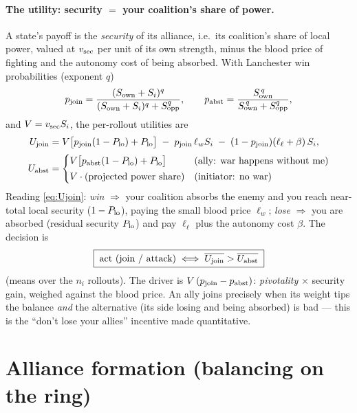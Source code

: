 \documentclass[11pt]{article}
\newcommand{\Sown}{S_{\mathrm{own}}}
\newcommand{\Sopp}{S_{\mathrm{opp}}}
\begin{document}
\paragraph{The utility: security $=$ your coalition's share of power.} A state's
payoff is the \emph{security} of its alliance, i.e.\ its coalition's share of
local power, valued at $v_{\rm sec}$ per unit of its own strength, minus the
blood price of fighting and the autonomy cost of being absorbed. With Lanchester
win probabilities (exponent $q$)
\begin{equation}
p_{\rm join}=\frac{(\Sown+S_i)^q}{(\Sown+S_i)^q+\Sopp^q},\qquad
p_{\rm abst}=\frac{\Sown^{\,q}}{\Sown^{\,q}+\Sopp^q},
\end{equation}
and $V=v_{\rm sec}S_i$, the per-rollout utilities are
\begin{align}
U_{\rm join} &= V\big[p_{\rm join}(1-P_{\rm lo})+P_{\rm lo}\big]
   \;-\;p_{\rm join}\,\ell_w S_i\;-\;(1-p_{\rm join})(\ell_\ell+\beta)\,S_i,
   \label{eq:Ujoin}\\[2pt]
U_{\rm abst} &=
  \begin{cases}
   V\big[p_{\rm abst}(1-P_{\rm lo})+P_{\rm lo}\big] & \text{(ally: war happens without me)}\\[2pt]
   V\cdot \text{(projected power share)} & \text{(initiator: no war)}
  \end{cases}
  \label{eq:Uabst}
\end{align}
Reading \eqref{eq:Ujoin}: \emph{win} $\Rightarrow$ your coalition absorbs the
enemy and you reach near-total local security ($1-P_{\rm lo}$), paying the small
blood price $\ell_w$; \emph{lose} $\Rightarrow$ you are absorbed (residual
security $P_{\rm lo}$) and pay $\ell_\ell$ plus the autonomy cost $\beta$. The
decision is
\begin{equation}
\boxed{\;\text{act (join / attack)} \iff
\overline{U_{\rm join}} > \overline{U_{\rm abst}}\;}
\end{equation}
(means over the $n_i$ rollouts). The driver is
$V\,(p_{\rm join}-p_{\rm abst})$: \emph{pivotality} $\times$ security gain,
weighed against the blood price. An ally joins precisely when its weight tips the
balance \emph{and} the alternative (its side losing and being absorbed) is bad ---
this is the ``don't lose your allies'' incentive made quantitative.

\section{Alliance formation (balancing on the ring)}\label{sec:alliances}
\end{document}
